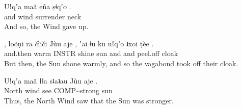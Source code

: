 \begin{exe}
 \ex 
{} {Uǃqʼa} {maã} {eña} {ṣǂqʼo} .\\ 
and wind  surrender neck {}\\ 
\glt And so, the Wind gave up.
\end{exe}

\begin{exe}
 \ex 
{} , {loõṇi} {ra} {čìiči} {Jùu} {aje} , {ʼai} {ǂu} {ku} {uǃqʼo} {ʇxoi} {ṭèe} .\\ 
and.then {} warm INSTR shine sun  {} and and  peel.off cloak  {}\\ 
\glt But then, the Sun shone warmly, and so the vagabond took off their cloak.
\end{exe}

\begin{exe}
 \ex 
{} {Uǃqʼa} {maã} {łǁa} {sʇaʇau} {Jùu} {aje} .\\ 
North wind  see COMP\textasciitilde{}strong sun  {}\\ 
\glt Thus, the North Wind saw that the Sun was stronger.
\end{exe}